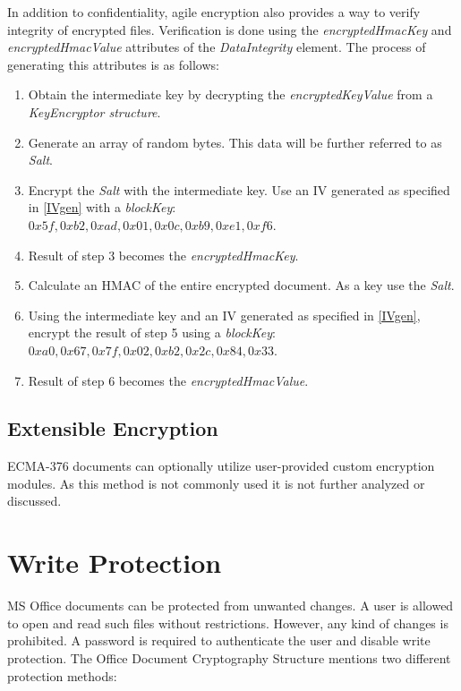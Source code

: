 \documentclass[11pt,oneside]{fithesis2}
\begin{document}
In addition to confidentiality, agile encryption also provides a way to verify integrity of encrypted files. Verification is done using the \textit{encryptedHmacKey} and \textit{encryptedHmacValue} attributes of the \textit{DataIntegrity} element. The process of generating this attributes is as follows:

\begin{enumerate}
\setlength\itemsep{0.1em}
	\item{Obtain the intermediate key by decrypting the \textit{encryptedKeyValue} from a \textit{KeyEncryptor structure}.}
	\item{Generate an array of random bytes. This data will be further referred to as \textit{Salt}.}
	\item{Encrypt the \textit{Salt} with the intermediate key. Use an IV generated as specified in \ref{IVgen} with a \textit{blockKey}: \\ $0x5f, 0xb2, 0xad, 0x01, 0x0c, 0xb9, 0xe1, 0xf6$.}
	\item{Result of step 3 becomes the \textit{encryptedHmacKey}.}
	\item{Calculate an HMAC of the entire encrypted document. As a key use the \textit{Salt}.}
	\item{Using the intermediate key and an IV generated as specified in \ref{IVgen}, encrypt the result of step 5 using a \textit{blockKey}: \\ $0xa0, 0x67, 0x7f, 0x02, 0xb2, 0x2c, 0x84, 0x33$.}
	\item{Result of step 6 becomes the \textit{encryptedHmacValue}.}
\end{enumerate}

\subsection{Extensible Encryption} 

ECMA-376 documents can optionally utilize user-provided custom encryption modules. As this method is not commonly used it is not further analyzed or discussed.  

\section{Write Protection}

MS Office documents can be protected from unwanted changes. A user is allowed to open and read such files without restrictions. However, any kind of changes is prohibited. A password is required to authenticate the user and disable write protection. The Office Document Cryptography Structure mentions two different protection methods:
\end{document}

